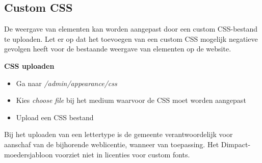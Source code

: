 \subsection{Custom CSS}\label{custom css}
De weergave van elementen kan worden aangepast door een custom CSS-bestand te uploaden. Let er op dat het toevoegen van een custom CSS mogelijk negatieve gevolgen heeft voor de bestaande weergave van elementen op de website.

\textbf{CSS uploaden}

\begin{itemize}
\item Ga naar \emph{/admin/appearance/css}
\item Kies \emph{choose file} bij het medium waarvoor de CSS moet worden aangepast
\item Upload een CSS bestand
\end{itemize}

Bij het uploaden van een lettertype is de gemeente verantwoordelijk voor aanschaf van de bijhorende weblicentie, wanneer van toepassing. Het Dimpact-moedersjabloon voorziet niet in licenties voor custom fonts.
